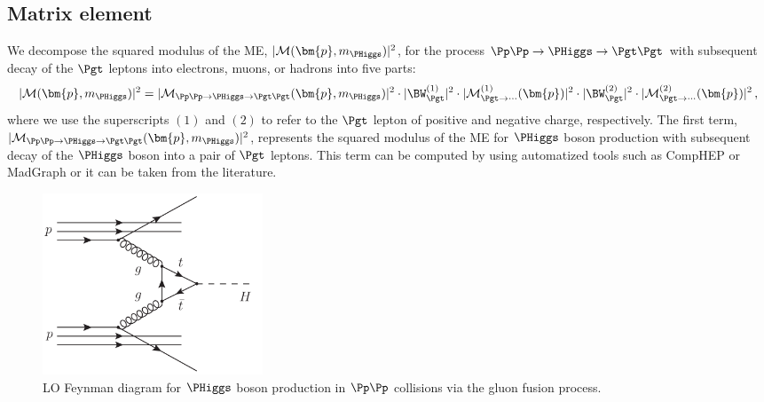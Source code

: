 \subsection{Matrix element}
\label{sec:mem_ME}

We decompose the squared modulus of the ME, $\vert \mathcal{M}(\bm{p},m_{\PHiggs}) \vert^{2}$, for the process $\Pp\Pp \to \PHiggs \to \Pgt\Pgt$
with subsequent decay of the $\Pgt$ leptons into electrons, muons, or
hadrons into five parts:
\begin{equation}
\vert \mathcal{M}(\bm{p},m_{\PHiggs}) \vert^{2} = 
 \vert \mathcal{M}_{\Pp\Pp \to \PHiggs \to
   \Pgt\Pgt}(\bm{p},m_{\PHiggs}) \vert^{2} 
\cdot \vert \BW_{\Pgt}^{(1)} \vert^{2} 
\cdot \vert \mathcal{M}^{(1)}_{\Pgt\to\cdots}(\bm{p}) \vert^{2} 
\cdot \vert \BW_{\Pgt}^{(2)} \vert^{2} 
\cdot \vert \mathcal{M}^{(2)}_{\Pgt\to\cdots}(\bm{p}) \vert^{2} \, ,
 \label{eq:meFactorization}
\end{equation}
where we use the superscripts $(1)$ and $(2)$ to refer to the $\Pgt$ lepton of positive and negative charge, respectively.
The first term, $\vert \mathcal{M}_{\Pp\Pp \to \PHiggs \to
  \Pgt\Pgt}(\bm{p},m_{\PHiggs}) \vert^{2}$, represents the squared
modulus of the ME for $\PHiggs$ boson production with subsequent decay of the $\PHiggs$ boson into a pair of $\Pgt$ leptons.
This term can be computed by using automatized tools such as
CompHEP or MadGraph or it can be taken from the literature.

\begin{figure}
\begin{center}
\includegraphics*[height=54mm]{figures/ggH_FeynmanDiagram.pdf}
\end{center}
\caption{
  LO Feynman diagram for $\PHiggs$ boson production in $\Pp\Pp$ collisions via the gluon fusion process.
}
\label{fig:ggH_FeynmanDiagram}
\end{figure}

